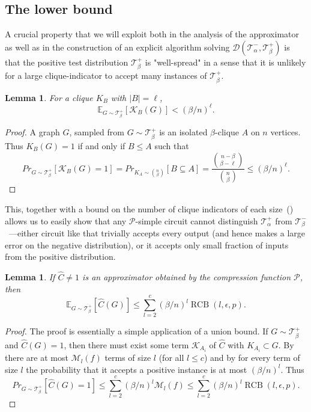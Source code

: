 \documentclass[10pt,a4paper]{article}
\newcommand{\RCB}{\mathop{RCB}}
\newtheorem{lemma}[theorem]{Lemma}
\begin{document}
\fi

\subsection{The lower bound}
A crucial property that we will exploit both in the analysis of the approximator as well as in the construction of an explicit algorithm solving $\mathcal{D}(\mathcal{T}^-_\alpha, \mathcal{T}^+_\beta)$ is that the positive test distribution $\mathcal{T}^+_{\beta}$ is "well-spread" in a sense that it is unlikely for a large clique-indicator to accept many instances of $\mathcal{T}^+_{\beta}$.

\begin{lemma}
\label{lem:minterm-accepts}
    For a clique $K_B$ with $|B| = \ell$, $$\mathbb{E}_{G \sim \mathcal{T}^+_{\beta}}[\mathcal{K}_B(G)] < (\beta / n)^\ell.$$
\end{lemma}
\begin{proof}
    A graph $G$, sampled from $G \sim \mathcal{T}^+_{\beta}$ is an isolated $\beta$-clique $A$ on $n$ vertices. Thus $K_B(G) = 1$ if and only if $B \leq A$ such that 
    $$Pr_{G \sim \mathcal{T}^+_{\beta}}[\mathcal{K}_B(G) = 1] = Pr_{K_A \sim \binom{n}{\beta}}[B \subseteq A] = \frac{\binom{n-\beta}{\beta - \ell}}{\binom{n}{\beta}} \leq (\beta / n)^\ell.$$
\end{proof}

This, together with a bound on the number of clique indicators of each size~() allows us to easily show that any $\mathcal{P}$-simple circuit cannot distinguish $\mathcal{T}^+_{\alpha}$ from $\mathcal{T}^-_{\beta}$~---either circuit like that trivially accepts every output (and hence makes a large error on the negative distribution), or it accepts only small fraction of inputs from the positive distribution.

\begin{lemma}
\label{lem:simple-circuits-fails}
    If $\hat{C} \neq 1$ is an approximator obtained by the compression function $\mathcal{P}$, then 
    $$\mathbb{E}_{G \sim \mathcal{T}^+_\beta}[\hat{C}(G)] \leq \sum_{l=2}^c (\beta / n)^l \RCB(l, \epsilon, p).$$
\end{lemma}

\begin{proof}
    The proof is essentially a simple application of a union bound. If $G \sim \mathcal{T}^+_\beta$ and $\hat{C}(G) = 1$, then there must exist some term $\mathcal{K}_{A_i}$ of $\hat{C}$ with $K_{A_i} \subset G$. By~ there are at most $\mathcal{M}_l(f)$ terms of size $l$ (for all $l \leq c$) and by  for every term of size $l$ the probability that it accepts a positive instance is at most $(\beta/n)^l$. Thus
    $$Pr_{G \sim \mathcal{T}^+_\beta}[\hat{C}(G) = 1] \leq \sum_{l=2}^c (\beta / n)^l \mathcal{M}_l(f) \leq \sum_{l=2}^c (\beta / n)^l \RCB(l, \epsilon, p).$$
\end{proof}
\end{document}
